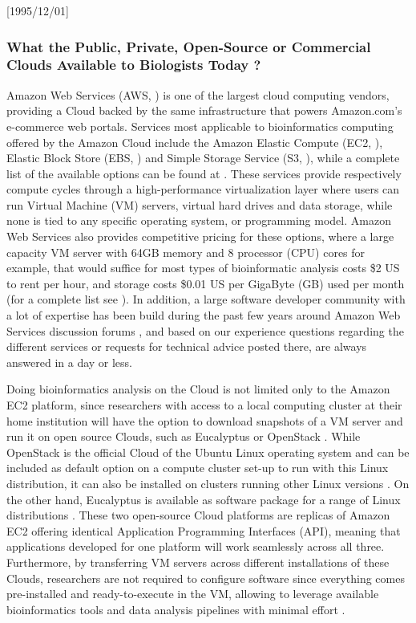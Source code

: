 \NeedsTeXFormat{LaTeX2e}[1995/12/01] \documentclass[10pt]{bmc_article}
\newenvironment{bmcformat}{\begin{raggedright}\baselineskip20pt\sloppy\setboolean{publ}{false}}{\end{raggedright}\baselineskip20pt\sloppy}
\begin{document}
\begin{bmcformat}
\subsubsection*{What the Public, Private, Open-Source or Commercial Clouds Available to Biologists Today ?} 

Amazon Web Services (AWS, \cite{aws}) is one of the largest cloud computing vendors, providing a Cloud backed  
by the same infrastructure that powers Amazon.com's e-commerce web portals. Services most applicable to 
bioinformatics computing offered by the Amazon Cloud include the Amazon Elastic Compute (EC2, \cite{awsec2}),  
Elastic Block Store (EBS, \cite{ebs}) and Simple Storage Service (S3, \cite{s3}), while a complete list of the available 
options can be found at \cite{aws}. These services provide respectively compute cycles through a high-performance 
virtualization layer where users can run Virtual Machine (VM) servers, virtual hard drives and data storage, while none
is tied to any specific operating system, or programming model. Amazon Web Services also provides competitive
pricing for these options, where a large capacity VM server with 64GB memory and 8 processor (CPU) cores for 
example, that would suffice for most types of bioinformatic analysis costs \$2 US to rent per hour, and storage costs 
\$0.01 US per GigaByte (GB) used per month (for a complete list see \cite{ec2price}). In addition, a large software 
developer community with a lot of expertise has been build during the past few years around Amazon Web Services 
discussion forums \cite{awsforums}, and based on our experience questions regarding the different services or 
requests for technical advice posted there, are always answered in a day or less.

Doing bioinformatics analysis on the Cloud is not limited only to the Amazon EC2 platform, since researchers
with access to a local computing cluster at their home institution will have the option to download snapshots 
of a VM server and run it on open source Clouds, such as Eucalyptus \cite{euca} or OpenStack \cite{openstack}.
While OpenStack is the official Cloud of the Ubuntu Linux operating system \cite{ubuntucloud} and can be included 
as default option on a compute cluster set-up to run with this Linux distribution, it can also be installed on 
clusters running other Linux versions \cite{openstackother}. On the other hand, Eucalyptus is available as software 
package for a range of Linux distributions \cite{eucalyptusother}. These two open-source Cloud platforms are replicas 
of Amazon EC2 offering identical Application Programming Interfaces (API), meaning that applications developed 
for one platform will work seamlessly across all three. Furthermore, by transferring VM servers across different 
installations of these Clouds, researchers are not required to configure software since everything comes pre-installed 
and ready-to-execute in the VM, allowing to leverage available bioinformatics tools and data analysis pipelines 
with minimal effort \cite{Krampis2012}.


\end{bmcformat}
\end{document}
